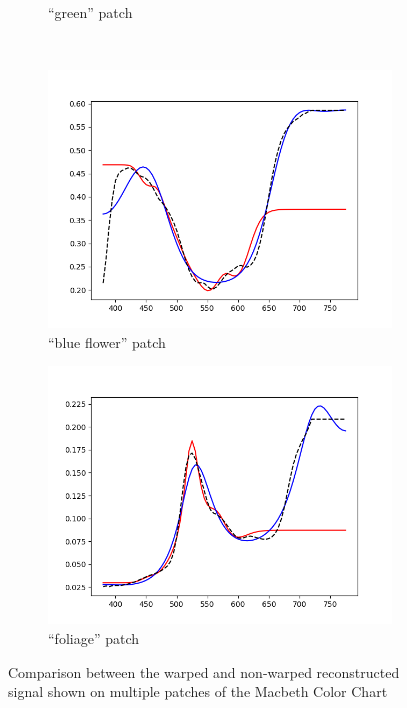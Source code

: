 \begin{figure}[t]
\begin{subfigure}[t]{0.45\textwidth}
		\caption{``green'' patch}
		\label{fig:resultsTechnique_green}
	\end{subfigure} \hspace{0.1em}
	\vspace{0.5em}\\
	\begin{subfigure}[t]{0.45\textwidth}
		\includegraphics[width=\linewidth]{img/results_techniqueBlueFlower.png}
		\caption{``blue flower'' patch}
		\label{fig:resultsTechnique_blueFlower}
	\end{subfigure} \hspace{0.1em}
	\begin{subfigure}[t]{0.45\textwidth}
		\includegraphics[width=\linewidth]{img/results_techniqueFoliage.png}
		\caption{``foliage'' patch}
		\label{fig:resultsTechnique_foliage}
	\end{subfigure}
	\caption{Comparison between the warped and non-warped reconstructed signal shown on multiple patches of the Macbeth Color Chart}
	\label{fig:resultsTechniques}
\end{figure}


